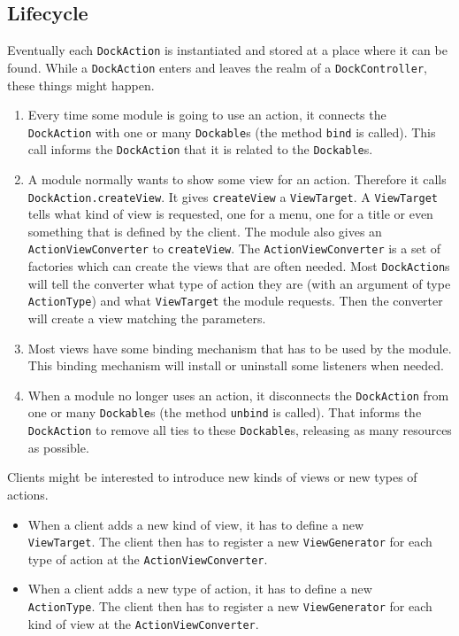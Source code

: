 \documentclass[a4paper,10pt]{article}
\newcommand{\src}[1]{\lstinline[basicstyle=\normalsize\ttfamily,keywordstyle=\normalsize\ttfamily,identifierstyle=\normalsize\ttfamily]|#1|}
\begin{document}
\subsection{Lifecycle}
Eventually each \src{DockAction} is instantiated and stored at a place where it can be found. While a \src{DockAction} enters and leaves the realm of a \src{DockController}, these things might happen.
\begin{enumerate}
 \item Every time some module is going to use an action, it connects the \\\src{DockAction} with one or many \src{Dockable}s (the method \src{bind} is called). This call informs the \src{DockAction} that it is related to the \src{Dockable}s.
 \item A module normally wants to show some view for an action. Therefore it calls \src{DockAction.createView}. It gives \src{createView} a \src{ViewTarget}. A \src{ViewTarget} tells what kind of view is requested, one for a menu, one for a title or even something that is defined by the client. The module also gives an \src{ActionViewConverter} to \src{createView}. The \src{ActionViewConverter} is a set of factories which can create the views that are often needed. Most \src{DockAction}s will tell the converter what type of action they are (with an argument of type \src{ActionType}) and what \src{ViewTarget} the module requests. Then the converter will create a view matching the parameters.
 \item Most views have some binding mechanism that has to be used by the module. This binding mechanism will install or uninstall some listeners when needed.
 \item When a module no longer uses an action, it disconnects the \src{DockAction} from one or many \src{Dockable}s (the method \src{unbind} is called). That informs the \src{DockAction} to remove all ties to these \src{Dockable}s, releasing as many resources as possible.
\end{enumerate}
Clients might be interested to introduce new kinds of views or new types of actions.
\begin{itemize}
 \item When a client adds a new kind of view, it has to define a new \\\src{ViewTarget}. The client then has to register a new \src{ViewGenerator} for each type of action at the \src{ActionViewConverter}.
 \item When a client adds a new type of action, it has to define a new \\\src{ActionType}. The client then has to register a new \src{ViewGenerator} for each kind of view at the \src{ActionViewConverter}.
\end{itemize}
\end{document}
